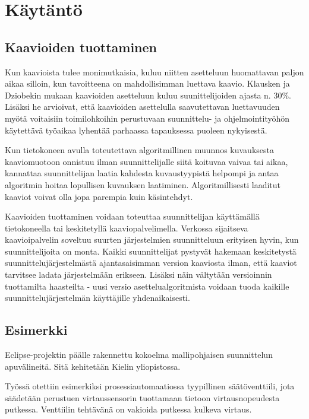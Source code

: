 \documentclass[finnish,12pt]{article}
\begin{document}
	\clearpage
	\section{Käytäntö}

		\subsection{Kaavioiden tuottaminen}

Kun kaavioista tulee monimutkaisia, kuluu niitten asetteluun huomattavan paljon aikaa silloin, kun tavoitteena on mahdollisimman luettava kaavio.
Klausken ja Dziobekin mukaan kaavioiden asetteluun kuluu suunittelijoiden ajasta n. 30\%.
Lisäksi he arvioivat, että kaavioiden asettelulla saavutettavan luettavuuden myötä voitaisiin toimilohkoihin perustuvaan suunnittelu- ja ohjelmointityöhön käytettävä työaikaa lyhentää parhaassa tapauksessa puoleen nykyisestä. \cite{Refworks:63}

Kun tietokoneen avulla toteutettava algoritmillinen muunnos kuvauksesta kaaviomuotoon onnistuu ilman suunnittelijalle siitä koituvaa vaivaa tai aikaa, kannattaa suunnittelijan laatia kahdesta kuvaustyypistä helpompi ja antaa algoritmin hoitaa lopullisen kuvauksen laatiminen.
Algoritmillisesti laaditut kaaviot voivat olla jopa parempia kuin käsintehdyt.

Kaavioiden tuottaminen voidaan toteuttaa suunnittelijan käyttämällä tietokoneella tai keskitetyllä kaaviopalvelimella.
Verkossa sijaitseva kaavioipalvelin soveltuu suurten järjestelmien suunnitteluun erityisen hyvin, kun suunnittelijoita on monta.
Kaikki suunnittelijat pystyvät hakemaan keskitetystä suunnittelujärjestelmästä ajantasaisimman version kaaviosta ilman, että kaaviot tarvitsee ladata järjestelmään erikseen.
Lisäksi näin vältytään versioinnin tuottamilta haasteilta - uusi versio asettelualgoritmista voidaan tuoda kaikille suunnittelujärjestelmän käyttäjille yhdenaikaisesti.

		\subsection{Esimerkki}

Eclipse-projektin päälle rakennettu kokoelma mallipohjaisen suunnittelun apuvälineitä. Sitä kehitetään Kielin yliopistossa. 

Työssä otettiin esimerkiksi prosessiautomaatiossa tyypillinen säätöventtiili, jota säädetään perustuen virtaussensorin tuottamaan tietoon virtausnopeudesta putkessa. Venttiilin tehtävänä on vakioida putkessa kulkeva virtaus.
\end{document}
